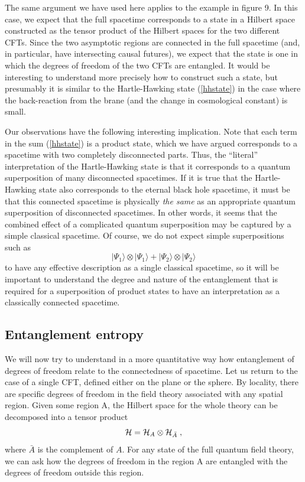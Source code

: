\documentclass[12pt,epsf]{article}
\renewcommand{\(}{\left(}
\renewcommand{\)}{\right)}
\begin{document}
The same argument we have used here applies to the example in figure 9. In this case, we expect that the full spacetime corresponds to a state in a Hilbert space constructed as the tensor product of the Hilbert spaces for the two different CFTs. Since the two asymptotic regions are connected in the full spacetime (and, in particular, have intersecting causal futures), we expect that the state is one in which the degrees of freedom of the two CFTs are entangled. It would be interesting to understand more precisely how to construct such a state, but presumably it is similar to the Hartle-Hawking state (\ref{hhstate}) in the case where the back-reaction from the brane (and the change in cosmological constant) is small.

Our observations have the following interesting implication. Note that each term in the sum (\ref{hhstate}) is a product state, which we have argued corresponds to a spacetime with two completely disconnected parts. Thus, the ``literal'' interpretation of the Hartle-Hawking state is that it corresponds to a quantum superposition of many disconnected spacetimes. If it is true that the Hartle-Hawking state also corresponds to the eternal black hole spacetime, it must be that this connected spacetime is physically {\it the same} as an appropriate quantum superposition of disconnected spacetimes. In other words, it seems that the combined effect of a complicated quantum superposition may be captured by a simple classical spacetime. Of course, we do not expect simple superpositions such as
\[
|\Psi_1 \rangle \otimes |\Psi_1 \rangle + |\Psi_2 \rangle \otimes |\Psi_2 \rangle
\]
to have any effective description as a single classical spacetime, so it will be important to understand the degree and nature of the entanglement that is required for a superposition of product states to have an interpretation as a classically connected spacetime.

\subsection{Entanglement entropy}

We will now try to understand in a more quantitative way how entanglement of degrees of freedom relate to the connectedness of spacetime. Let us return to the case of a single CFT, defined either on the plane or the sphere. By locality, there are specific degrees of freedom in the field theory associated with any spatial region. Given some region A, the Hilbert space for the whole theory can be decomposed into a tensor product
\[
{\cal H} = {\cal H}_A \otimes {\cal H}_{\bar{A}} \; ,
\]
where $\bar{A}$ is the complement of $A$. For any state of the full quantum field theory, we can ask how the degrees of freedom in the region A are entangled with the degrees of freedom outside this region.
\end{document}
